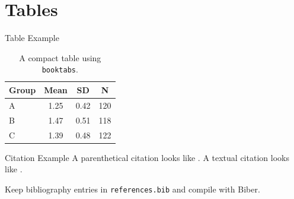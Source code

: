 ﻿\section{Tables}

\begin{frame}{Table Example}
\begin{table}
\centering
\begin{tabular}{lccc}
\toprule
Group & Mean & SD & N \\
\midrule
A & 1.25 & 0.42 & 120 \\
B & 1.47 & 0.51 & 118 \\
C & 1.39 & 0.48 & 122 \\
\bottomrule
\end{tabular}
\caption{A compact table using \texttt{booktabs}.}
\end{table}
\end{frame}

\begin{frame}{Citation Example}
A parenthetical citation looks like \parencite{einstein1905}. A textual citation looks like \textcite{einstein1905}.

\vspace{0.6cm}
Keep bibliography entries in \texttt{references.bib} and compile with Biber.
\end{frame}
